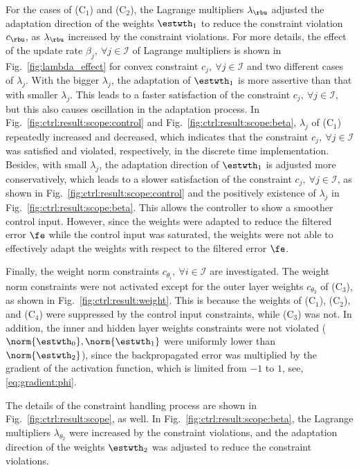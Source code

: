 \documentclass[lettersize,journal]{IEEEtran}
\begin{document}
For the cases of (C$_1$) and (C$_2$), the Lagrange multipliers $\lambda_{\rbu}$ adjusted the adaptation direction of the weights $\estwth_1$ to reduce the constraint violation $c_{\rbu}$, as $\lambda_{\rbu}$ increased by the constraint violations.
For more details, the effect of the update rate $\beta_j,\ \forall j\in\mathcal I$ of Lagrange multipliers is shown in Fig.~\ref{fig:lambda_effect} for convex constraint $c_j,\ \forall j\in\mathcal I$ and two different cases of $\lambda_j$.
With the bigger $\lambda_j$, the adaptation of $\estwth_1$ is more assertive than that with smaller $\lambda_j$.
This leads to a faster satisfaction of the constraint $c_j,\ \forall j\in\mathcal I$, but this also causes oscillation in the adaptation process.
In Fig.~\ref{fig:ctrl:result:scope:control} and Fig.~\ref{fig:ctrl:result:scope:beta}, $\lambda_j$ of (C$_1$) repeatedly increased and decreased, which indicates that the constraint $c_j,\ \forall j\in\mathcal I$ was satisfied and violated, respectively, in the discrete time implementation.
Besides, with small $\lambda_j$, the adaptation direction of $\estwth_1$ is adjusted more conservatively, which leads to a slower satisfaction of the constraint $c_j,\ \forall j\in\mathcal I$, as shown in Fig.~\ref{fig:ctrl:result:scope:control} and the positively existence of $\lambda_j$ in Fig.~\ref{fig:ctrl:result:scope:beta}.
This allows the controller to show a smoother control input.
However, since the weights were adapted to reduce the filtered error $\fe$ while the control input was saturated, the weights were not able to effectively adapt the weights with respect to the filtered error $\fe$.

\hfill 

Finally, the weight norm constraints $c_{\theta_i},\ \forall i\in\mathcal I$ are investigated.
The weight norm constraints were not activated except for the outer layer weights $c_{\theta_2}$ of (C$_3$), as shown in Fig.~\ref{fig:ctrl:result:weight}.
This is because the weights of (C$_1$), (C$_2$), and (C$_4$) were suppressed by the control input constraints, while (C$_3$) was not.
In addition, the inner and hidden layer weights constraints were not violated (\ie $\norm{\estwth_0},\norm{\estwth_1}$ were uniformly lower than $\norm{\estwth_2}$), since the backpropagated error was multiplied by the gradient of the activation function, which is limited from $-1$ to $1$, \ie see, \eqref{eq:gradient:phi}.  

The details of the constraint handling process are shown in Fig.~\ref{fig:ctrl:result:scope}, as well.
In Fig.~\ref{fig:ctrl:result:scope:beta}, the Lagrange multipliers $\lambda_{\theta_2}$ were increased by the constraint violations, and the adaptation direction of the weights $\estwth_2$ was adjusted to reduce the constraint violations.
\end{document}
